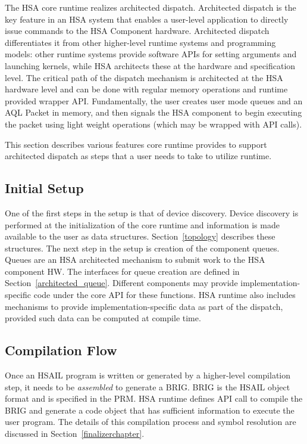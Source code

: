 \documentclass{book}
\begin{document}
The HSA core runtime realizes architected dispatch. Architected
dispatch is the key feature in an HSA system that enables a
user-\/level application to directly issue commands to the HSA
Component hardware.  Architected dispatch differentiates it from
other higher-\/level runtime systems and programming models\-: other
runtime systems provide software A\-P\-Is for setting arguments and
launching kernels, while H\-S\-A architects these at the hardware
and specification level.  The critical path of the dispatch
mechanism is architected at the H\-S\-A hardware level and can be
done with regular memory operations and runtime provided wrapper
API.  Fundamentally, the user creates user mode queues and an
A\-Q\-L Packet in memory, and then signals the HSA component to
begin executing the packet using light weight operations (which may
be wrapped with A\-P\-I calls).

This section describes various features core runtime provides to
support architected dispatch as steps that a user needs to take to
utilize runtime.

\subsection{Initial Setup}
One of the first steps in the setup is that of device discovery.
Device discovery is performed at the initialization of the core
runtime and information is made available to the user as data
structures. Section~\ref{topology} describes these structures.
The next step in the setup is creation of the
component queues. Queues are an HSA architected mechanism to submit
work to the HSA component HW. The interfaces for queue creation
are defined in Section~\ref{architected_queue}. Different
components may provide
implementation-\/specific code under the core A\-P\-I for these
functions. H\-S\-A runtime also includes mechanisms to provide
implementation-\/specific data as part of the dispatch, provided
such data can be computed at compile time.

\subsection{Compilation Flow}
Once an HSAIL program is written or generated by a higher-level
compilation step, it needs to be \emph{assembled} to generate a
BRIG. BRIG is the HSAIL object format and is specified in the PRM.
HSA runtime defines API call to compile the BRIG and generate a code
object that has sufficient information to execute the user
program. The details of this compilation process and symbol
resolution are discussed in Section~\ref{finalizerchapter}.
\end{document}
